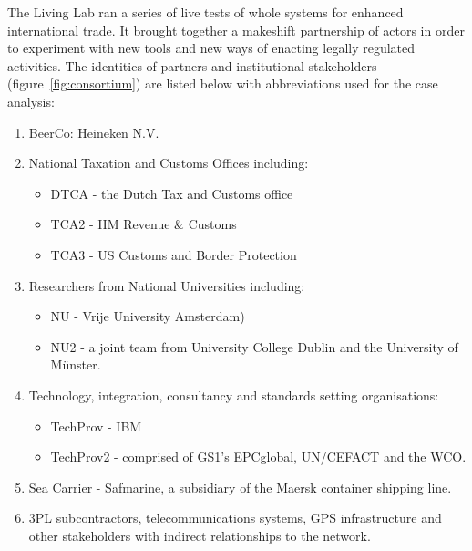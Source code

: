 \documentclass[graybox]{styles/svmult}
\begin{document}
The Living Lab ran a series of live tests of whole systems for enhanced international trade.
It brought together a makeshift partnership of actors in order to experiment with new tools and new ways of enacting legally regulated activities.
The identities of partners and institutional stakeholders (figure~\ref{fig:consortium}) are listed below with abbreviations used for the case analysis:
\begin{enumerate}
\item BeerCo: Heineken N.V.
\item National Taxation and Customs Offices including: 
    \begin{itemize}
    \item DTCA - the Dutch Tax and Customs office
    \item TCA2 - HM Revenue \& Customs
    \item TCA3 - US Customs and Border Protection
    \end{itemize}
\item Researchers from National Universities including: 
    \begin{itemize}
    \item NU - Vrije University Amsterdam)
    \item NU2 - a joint team from University College Dublin and the University of Münster.
    \end{itemize}
\item  Technology, integration, consultancy and standards setting organisations:
    \begin{itemize}
    \item TechProv - IBM
    \item TechProv2 - comprised of GS1's EPCglobal, UN/CEFACT and the WCO.
    \end{itemize}
\item Sea Carrier - Safmarine, a subsidiary of the Maersk container shipping line.
\item 3PL subcontractors, telecommunications systems, GPS infrastructure and other stakeholders with indirect relationships to the network.
\end{enumerate}
\end{document}
